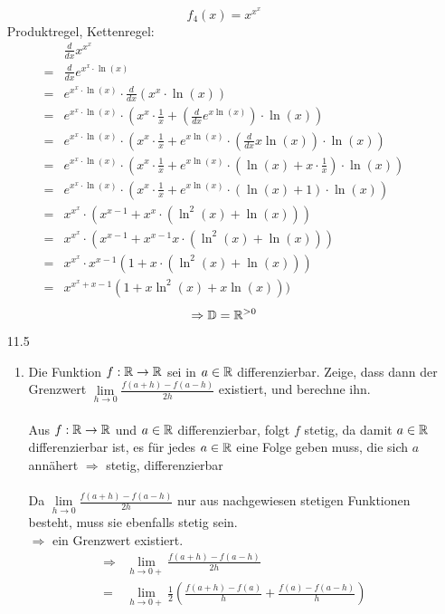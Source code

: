 \documentclass{HM}
\begin{document}
\begin{enumerate}
\newpage
$$f_4(x)=x^{x^x}$$
Produktregel, Kettenregel:
\begin{align*}
	&\frac{d}{dx}x^{x^x}\\
	=&\frac{d}{dx}e^{x^x\cdot\ln(x)}\\
	=&e^{x^x\cdot\ln(x)}\cdot\frac{d}{dx}\left(x^x\cdot\ln(x)\right)\\
	=&e^{x^x\cdot\ln(x)}\cdot\left(x^x\cdot\frac{1}{x}+\left(\frac{d}{dx}e^{x\ln(x)}\right)\cdot\ln(x)\right)\\
	=&e^{x^x\cdot\ln(x)}\cdot\left(x^x\cdot\frac{1}{x}+e^{x\ln(x)}\cdot\left(\frac{d}{dx}x\ln(x)\right)\cdot\ln(x)\right)\\
	=&e^{x^x\cdot\ln(x)}\cdot\left(x^x\cdot\frac{1}{x}+e^{x\ln(x)}\cdot\left(\ln(x)+x\cdot\frac{1}{x}\right)\cdot\ln(x)\right)\\
	=&e^{x^x\cdot\ln(x)}\cdot\left(x^x\cdot\frac{1}{x}+e^{x\ln(x)}\cdot(\ln(x)+1)\cdot\ln(x)\right)\\
	=&x^{x^x}\cdot(x^{x-1}+ x^x\cdot(\ln^2(x)+\ln(x)))\\
	=&x^{x^x}\cdot(x^{x-1}+ x^{x-1}x\cdot(\ln^2(x)+\ln(x)))\\
	=&x^{x^x}\cdot x^{x-1}(1+x\cdot(\ln^2(x)+\ln(x)))\\
	=&x^{x^x+x-1}(1+x\ln^2(x)+x\ln(x)))
\end{align*}
$$\Rightarrow\mathbb{D}=\mathbb{R}^{>0}$$
\newpage
\item [11.5]
\begin{enumerate}
	\item Die Funktion $f:\mathbb{R}\to\mathbb{R}$ sei in $a\in\mathbb{R}$ differenzierbar. Zeige, dass dann der Grenzwert $\lim\limits_{h\to 0}\frac{f(a+h)-f(a-h)}{2h}$ existiert, und berechne ihn.\\\\
	Aus $f:\mathbb{R}\to\mathbb{R}$ und $a\in\mathbb{R}$ differenzierbar, folgt $f$ stetig, da damit $a\in\mathbb{R}$ differenzierbar ist, es für jedes $a\in\mathbb{R}$ eine Folge geben muss, die sich $a$ annähert 
	$\Rightarrow$ stetig, differenzierbar\\\\
	Da $\lim\limits_{h\to 0}\frac{f(a+h)-f(a-h)}{2h}$ nur aus nachgewiesen stetigen Funktionen besteht, muss sie ebenfalls stetig sein.\\
	$\Rightarrow$ ein Grenzwert existiert.\\
	\begin{align*}
	\Rightarrow&\lim\limits_{h\to 0+}\frac{f(a+h)-f(a-h)}{2h}\\
	=&\lim\limits_{h\to 0+}\frac{1}{2}\left(\frac{f(a+h)-f(a)}{h}+\frac{f(a)-f(a-h)}{h}\right)\\

\end{align*}
\end{enumerate}
\end{enumerate}
\end{document}
